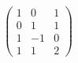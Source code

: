 \documentclass[10pt]{article}
\begin{document}
\begin{align*}\begin{pmatrix}
1 & 0 & 1\\
0 & 1 & 1\\
1 & -1 & 0 \\
1 & 1 & 2 
\end{pmatrix}\end{align*}
\end{document}

